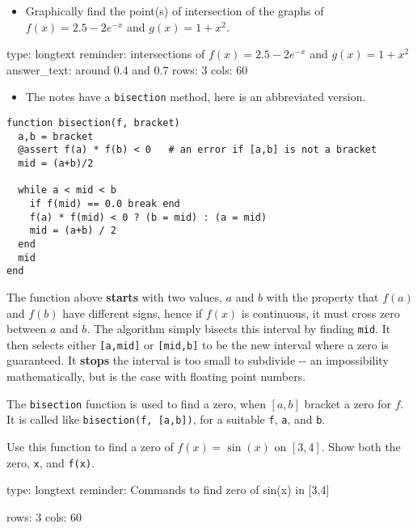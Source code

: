 \documentclass[12pt]{article}
\begin{document}
\begin{itemize}
\itemsep1pt\parskip0pt
\item
  Graphically find the point(s) of intersection of the graphs of
  $f(x) = 2.5-   2e^{-x}$ and $g(x) = 1 + x^2$.
\end{itemize}

\begin{answer}
type: longtext
reminder: intersections of \(f(x) = 2.5-2e^{-x}\) and \(g(x) = 1 + x^2\)
answer_text: around 0.4 and 0.7 
rows: 3
cols: 60
\end{answer}

\begin{itemize}
\itemsep1pt\parskip0pt
\item
  The notes have a \texttt{bisection} method, here is an abbreviated
  version.
\end{itemize}



\begin{verbatim}
function bisection(f, bracket)
  a,b = bracket  
  @assert f(a) * f(b) < 0   # an error if [a,b] is not a bracket
  mid = (a+b)/2

  while a < mid < b
    if f(mid) == 0.0 break end
    f(a) * f(mid) < 0 ? (b = mid) : (a = mid)  
    mid = (a+b) / 2
  end
  mid
end
\end{verbatim}
The function above \textbf{starts} with two values, $a$ and $b$ with the
property that $f(a)$ and $f(b)$ have different signs, hence if $f(x)$ is
continuous, it must cross zero between $a$ and $b$. The algorithm simply
bisects this interval by finding \texttt{mid}. It then selects either
\texttt{{[}a,mid{]}} or \texttt{{[}mid,b{]}} to be the new interval
where a zero is guaranteed. It \textbf{stops} the interval is too small
to subdivide -{}- an impossibility mathematically, but is the case with
floating point numbers.

The \texttt{bisection} function is used to find a zero, when $[a,b]$
bracket a zero for $f$. It is called like
\texttt{bisection(f, {[}a,b{]})}, for a suitable \texttt{f}, \texttt{a},
and \texttt{b}.

Use this function to find a zero of $f(x) = \sin(x)$ on $[3,4]$. Show
both the zero, \texttt{x}, and \texttt{f(x)}.

\begin{answer}
type: longtext
reminder: Commands to find zero of sin(x) in [3,4]

rows: 3
cols: 60
\end{answer}
\end{document}
